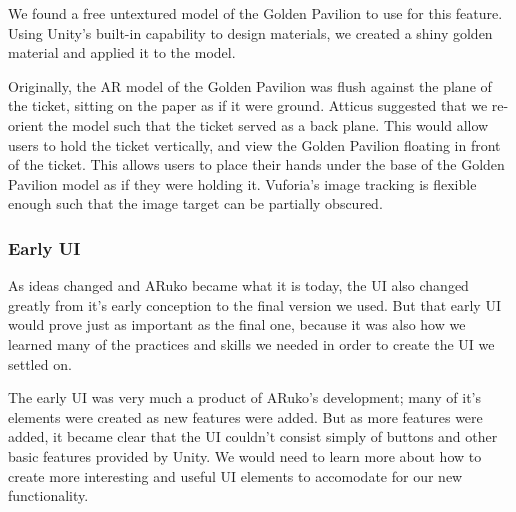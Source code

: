 \documentclass[a4paper, 10pt, american, titlepage]{article}
\begin{document}
We found a free untextured model of the Golden Pavilion to use for this
feature. Using Unity's built-in capability to design materials, we created
a shiny golden material and applied it to the model.

Originally, the AR model of the Golden Pavilion was flush against the plane of
the ticket, sitting on the paper as if it were ground. Atticus suggested that
we re-orient the model such that the ticket served as a back plane. This would
allow users to hold the ticket vertically, and view the Golden Pavilion
floating in front of the ticket. This allows users to place their hands under
the base of the Golden Pavilion model as if they were holding it. Vuforia's
image tracking is flexible enough such that the image target can be partially
obscured.

\subsubsection{Early UI}
\label{sec:earlyUI}

As ideas changed and ARuko became what it is today, the UI also changed
greatly from it's early conception to the final version we used. But
that early UI would prove just as important as the final one, because
it was also how we learned many of the practices and skills we needed in order
to create the UI we settled on. 

The early UI was very much a product of ARuko's development; many of it's
elements were created as new features were added. But as more features were
added, it became clear that the UI couldn't consist simply of buttons and 
other basic features provided by Unity. We would need to learn more about 
how to create more interesting and useful UI elements to accomodate for 
our new functionality. 
\end{document}
